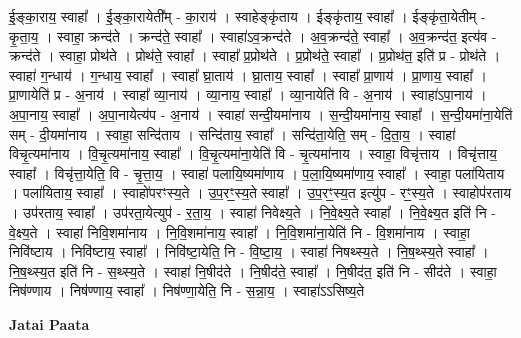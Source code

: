 \documentclass[17pt]{extarticle}
\begin{document}
ई॒ङ्‍का॒राय॒ स्वाहा᳚ । ई॒ङ्‍का॒रायेती᳚म् - का॒राय॑ । स्वाहेङ्‍कृ॑ताय । ईङ्‍कृ॑ताय॒ स्वाहा᳚ । ईङ्‍कृ॑ता॒येतीम् - कृ॒ता॒य॒ । स्वाहा॒ क्रन्द॑ते । क्रन्द॑ते॒ स्वाहा᳚ । स्वाहा॑ऽव॒क्रन्द॑ते । अ॒व॒क्रन्द॑ते॒ स्वाहा᳚ । अ॒व॒क्रन्द॑त॒ इत्य॑व - क्रन्द॑ते । स्वाहा॒ प्रोथ॑ते । प्रोथ॑ते॒ स्वाहा᳚ । स्वाहा᳚ प्र॒प्रोथ॑ते । प्र॒प्रोथ॑ते॒ स्वाहा᳚ । प्र॒प्रोथ॑त॒ इति॑ प्र - प्रोथ॑ते । स्वाहा॑ ग॒न्धाय॑ । ग॒न्धाय॒ स्वाहा᳚ । स्वाहा᳚ घ्रा॒ताय॑ । घ्रा॒ताय॒ स्वाहा᳚ । स्वाहा᳚ प्रा॒णाय॑ । प्रा॒णाय॒ स्वाहा᳚ । प्रा॒णायेति॑ प्र - अ॒नाय॑ । स्वाहा᳚ व्या॒नाय॑ । व्या॒नाय॒ स्वाहा᳚ । व्या॒नायेति॑ वि - अ॒नाय॑ । स्वाहा॑ऽपा॒नाय॑ । अ॒पा॒नाय॒ स्वाहा᳚ । अ॒पा॒नायेत्य॑प - अ॒नाय॑ । स्वाहा॑ सन्दी॒यमा॑नाय । स॒न्दी॒यमा॑नाय॒ स्वाहा᳚ । स॒न्दी॒यमा॑ना॒येति॑ सम् - दी॒यमा॑नाय । स्वाहा॒ सन्दि॑ताय । सन्दि॑ताय॒ स्वाहा᳚ । सन्दि॑ता॒येति॒ सम् - दि॒ता॒य॒ । स्वाहा॑ विचृ॒त्यमा॑नाय । वि॒चृ॒त्यमा॑नाय॒ स्वाहा᳚ । वि॒चृ॒त्यमा॑ना॒येति॑ वि - चृ॒त्यमा॑नाय । स्वाहा॒ विचृ॑त्ताय । विचृ॑त्ताय॒ स्वाहा᳚ । विचृ॑त्ता॒येति॒ वि - चृ॒त्ता॒य॒ । स्वाहा॑ पलायि॒ष्यमा॑णाय । प॒ला॒यि॒ष्यमा॑णाय॒ स्वाहा᳚ । स्वाहा॒ पला॑यिताय । पला॑यिताय॒ स्वाहा᳚ । स्वाहो॑परꣳस्य॒ते । उ॒प॒रꣳ॒॒स्य॒ते स्वाहा᳚ । उ॒प॒रꣳ॒॒स्य॒त इत्यु॑प - रꣳ॒॒स्य॒ते । स्वाहोप॑रताय । उप॑रताय॒ स्वाहा᳚ । उप॑रता॒येत्युप॑ - र॒ता॒य॒ । स्वाहा॑ निवेक्ष्य॒ते । नि॒वे॒क्ष्य॒ते स्वाहा᳚ । नि॒वे॒क्ष्य॒त इति॑ नि - वे॒क्ष्य॒ते । स्वाहा॑ निवि॒शमा॑नाय । नि॒वि॒शमा॑नाय॒ स्वाहा᳚ । नि॒वि॒शमा॑ना॒येति॑ नि - वि॒शमा॑नाय । स्वाहा॒ निवि॑ष्टाय । निवि॑ष्टाय॒ स्वाहा᳚ । निवि॑ष्टा॒येति॒ नि - वि॒ष्टा॒य॒ । स्वाहा॑ निषथ्स्य॒ते । नि॒ष॒थ्स्य॒ते स्वाहा᳚ । नि॒ष॒थ्स्य॒त इति॑ नि - स॒थ्स्य॒ते । स्वाहा॑ नि॒षीद॑ते । नि॒षीद॑ते॒ स्वाहा᳚ । नि॒षीद॑त॒ इति॑ नि - सीद॑ते । स्वाहा॒ निष॑ण्णाय । निष॑ण्णाय॒ स्वाहा᳚ । निष॑ण्णा॒येति॒ नि - स॒न्ना॒य॒ । स्वाहा॑ऽऽसिष्य॒ते \newline

\textbf{Jatai Paata} \newline
\end{document}

